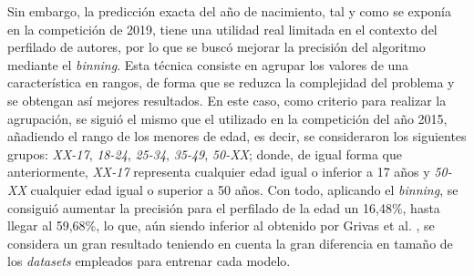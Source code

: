 \bigskip
\begin{table}[H]
	\centering
	\caption{Resultados de las pruebas realizadas con el algoritmo de Martinc et al. \cite{martinc2019hot}}
	\label{tab:pruebas_martinc}
\end{table}

Sin embargo, la predicción exacta del año de nacimiento, tal y como se exponía en la competición de 2019, tiene una utilidad real limitada en el contexto del perfilado de autores,
por lo que se buscó mejorar la precisión del algoritmo mediante el \textit{binning}. Esta técnica consiste en agrupar los valores de una característica en rangos, de forma que
se reduzca la complejidad del problema y se obtengan así mejores resultados. En este caso, como criterio para realizar la agrupación, se siguió el mismo que el utilizado
en la competición del año 2015, añadiendo el rango de los menores de edad, es decir, se consideraron los siguientes grupos: \textit{XX-17}, \textit{18-24}, \textit{25-34}, \textit{35-49}, \textit{50-XX};
donde, de igual forma que anteriormente, \textit{XX-17} representa cualquier edad igual o inferior a 17 años y \textit{50-XX} cualquier edad igual o superior a 50 años.
Con todo, aplicando el \textit{binning}, se consiguió aumentar la precisión para el perfilado de la edad un 16,48\%, hasta llegar al 59,68\%, lo que, aún siendo inferior
al obtenido por Grivas et al. \cite{grivas2015author}, se considera un gran resultado teniendo en cuenta la gran diferencia en tamaño de los \textit{datasets} empleados para entrenar
cada modelo.
